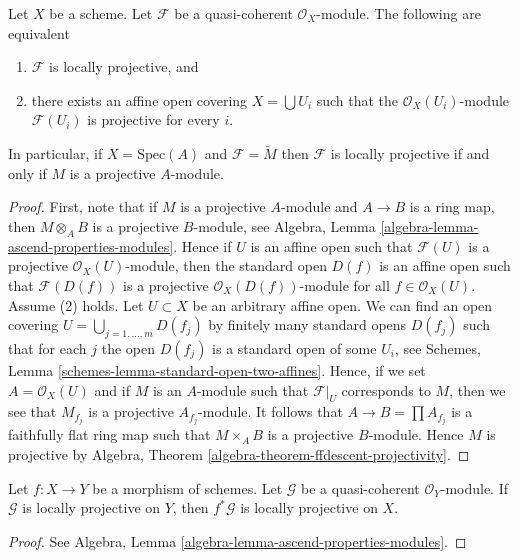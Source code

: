 \begin{lemma}
\label{lemma-locally-projective}
Let $X$ be a scheme.
Let $\mathcal{F}$ be a quasi-coherent $\mathcal{O}_X$-module.
The following are equivalent
\begin{enumerate}
\item $\mathcal{F}$ is locally projective, and
\item there exists an affine open covering $X = \bigcup U_i$
such that the $\mathcal{O}_X(U_i)$-module
$\mathcal{F}(U_i)$ is projective for every $i$.
\end{enumerate}
In particular, if $X = \text{Spec}(A)$ and $\mathcal{F} = \widetilde{M}$
then $\mathcal{F}$ is locally projective if and only if $M$ is a projective
$A$-module.
\end{lemma}

\begin{proof}
First, note that if $M$ is a projective $A$-module and $A \to B$ is a
ring map, then $M \otimes_A B$ is a projective $B$-module, see
Algebra, Lemma \ref{algebra-lemma-ascend-properties-modules}.
Hence if $U$ is an affine open such that $\mathcal{F}(U)$ is a projective
$\mathcal{O}_X(U)$-module, then the standard open $D(f)$ is an
affine open such that $\mathcal{F}(D(f))$ is a projective
$\mathcal{O}_X(D(f))$-module for all $f \in \mathcal{O}_X(U)$.
Assume (2) holds. Let $U \subset X$ be an arbitrary affine open.
We can find an open covering $U = \bigcup_{j = 1, \ldots, m} D(f_j)$
by finitely many standard opens $D(f_j)$ such that for each
$j$ the open $D(f_j)$ is a standard open of some $U_i$, see
Schemes, Lemma \ref{schemes-lemma-standard-open-two-affines}.
Hence, if we set $A = \mathcal{O}_X(U)$ and if $M$ is an $A$-module
such that $\mathcal{F}|_U$ corresponds to $M$, then we see that
$M_{f_j}$ is a projective $A_{f_j}$-module. It follows that
$A \to B = \prod A_{f_j}$ is a faithfully flat ring map
such that $M \times_A B$ is a projective $B$-module.
Hence $M$ is projective by
Algebra, Theorem \ref{algebra-theorem-ffdescent-projectivity}.
\end{proof}

\begin{lemma}
\label{lemma-locally-projective-pullback}
Let $f : X \to Y$ be a morphism of schemes.
Let $\mathcal{G}$ be a quasi-coherent $\mathcal{O}_Y$-module.
If $\mathcal{G}$ is locally projective on $Y$, then $f^*\mathcal{G}$
is locally projective on $X$.
\end{lemma}

\begin{proof}
See
Algebra, Lemma \ref{algebra-lemma-ascend-properties-modules}.
\end{proof}






